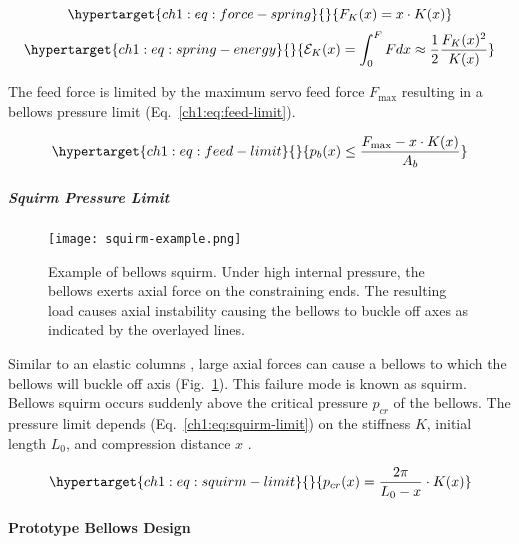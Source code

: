 \begin{equation}\protect\hypertarget{ch1:eq:force-spring}{}{ F_K(x) = x \cdot K(x)   
}\label{ch1:eq:force-spring}\end{equation}
\begin{equation}\protect\hypertarget{ch1:eq:spring-energy}{}{ \mathcal{E}_K(x) = \int_0^F F dx   
\approx \frac{1}{2} \frac{F_K(x)^2}{K(x)}   
}\label{ch1:eq:spring-energy}\end{equation}

The feed force is limited by the maximum servo feed force
\(F_\text{max}\) resulting in a bellows pressure limit
(Eq.~\ref{ch1:eq:feed-limit}).

\begin{equation}\protect\hypertarget{ch1:eq:feed-limit}{}{ 
p_b(x) \le \frac{ F_\text{max} - x \cdot K(x) }{ A_b }   
}\label{ch1:eq:feed-limit}\end{equation}

\hypertarget{ch1:squirm-pressure-limit}{%
\subparagraph{Squirm Pressure Limit}\label{ch1:squirm-pressure-limit}}

\begin{figure}
\hypertarget{ch1:fig:squirm}{%
\centering
\texttt{[image: squirm-example.png]}
\caption{Example of bellows squirm. Under high internal pressure, the
bellows exerts axial force on the constraining ends. The resulting load
causes axial instability causing the bellows to buckle off axes as
indicated by the overlayed lines.}\label{ch1:fig:squirm}
}
\end{figure}

Similar to an elastic columns \cite{hermann1997static}, large axial forces can cause a
bellows to which the bellows will buckle off axis
(Fig.~\ref{ch1:fig:squirm}). This failure mode is known as squirm. Bellows
squirm occurs suddenly above the critical pressure \(p_{cr}\) of the
bellows. The pressure limit depends (Eq.~\ref{ch1:eq:squirm-limit}) on the
stiffness \(K\), initial length \(L_0\), and compression distance \(x\)
\cite{hermann1997static}.

\begin{equation}\protect\hypertarget{ch1:eq:squirm-limit}{}{ 
p_{cr}(x) = \frac{2\pi}{L_0-x} \cdot K(x)   
}\label{ch1:eq:squirm-limit}\end{equation}


\hypertarget{ch1:prototype-bellows-design}{%
\paragraph{Prototype Bellows
Design}\label{ch1:prototype-bellows-design}}


